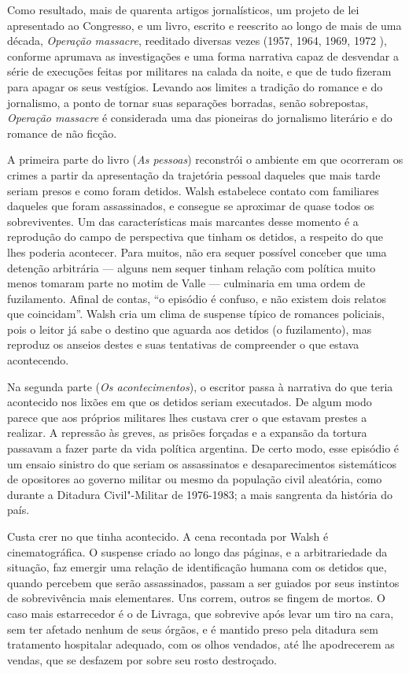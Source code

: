 Como resultado, mais de quarenta artigos jornalísticos, um projeto de
lei apresentado ao Congresso, e um livro, escrito e reescrito ao longo
de mais de uma década, \emph{Operação massacre}, reeditado diversas
vezes (1957, 1964, 1969, 1972 ), conforme aprumava as investigações e
uma forma narrativa capaz de desvendar a série de execuções feitas por
militares na calada da noite, e que de tudo fizeram para apagar os seus
vestígios. Levando aos limites a tradição do romance e do jornalismo, a
ponto de tornar suas separações borradas, senão sobrepostas,
\emph{Operação massacre} é considerada uma das pioneiras do jornalismo
literário e do romance de não ficção.

A primeira parte do livro (\emph{As pessoas}) reconstrói o ambiente em
que ocorreram os crimes a partir da apresentação da trajetória pessoal
daqueles que mais tarde seriam presos e como foram detidos. Walsh
estabelece contato com familiares daqueles que foram assassinados, e
consegue se aproximar de quase todos os sobreviventes. Um das
características mais marcantes desse momento é a reprodução do campo de
perspectiva que tinham os detidos, a respeito do que lhes poderia
acontecer. Para muitos, não era sequer possível conceber que uma
detenção arbitrária --- alguns nem sequer tinham relação com política
muito menos tomaram parte no motim de Valle --- culminaria em uma ordem
de fuzilamento. Afinal de contas, ``o episódio é confuso, e não existem
dois relatos que coincidam''. Walsh cria um clima de suspense típico de
romances policiais, pois o leitor já sabe o destino que aguarda aos
detidos (o fuzilamento), mas reproduz os anseios destes e suas
tentativas de compreender o que estava acontecendo.

Na segunda parte (\emph{Os acontecimentos}), o escritor passa à
narrativa do que teria acontecido nos lixões em que os detidos seriam
executados. De algum modo parece que aos próprios militares lhes custava
crer o que estavam prestes a realizar. A repressão às greves, as prisões
forçadas e a expansão da tortura passavam a fazer parte da vida política
argentina. De certo modo, esse episódio é um ensaio sinistro do que
seriam os assassinatos e desaparecimentos sistemáticos de opositores ao
governo militar ou mesmo da população civil aleatória, como durante a
Ditadura Civil"-Militar de 1976-1983; a mais sangrenta da história do
país.

Custa crer no que tinha acontecido. A cena recontada por Walsh é cinematográfica.
O suspense criado ao longo das páginas, e a arbitrariedade da situação,
faz emergir uma relação de identificação humana com os detidos que,
quando percebem que serão assassinados, passam a ser guiados por
seus instintos de sobrevivência mais elementares. Uns correm, outros se fingem de mortos.
O caso mais estarrecedor é o de Livraga, que sobrevive após levar um
tiro na cara, sem ter afetado nenhum de seus órgãos, e é mantido preso
pela ditadura sem tratamento hospitalar adequado, com os olhos vendados,
até lhe apodrecerem as vendas, que se desfazem por sobre seu rosto
destroçado.

